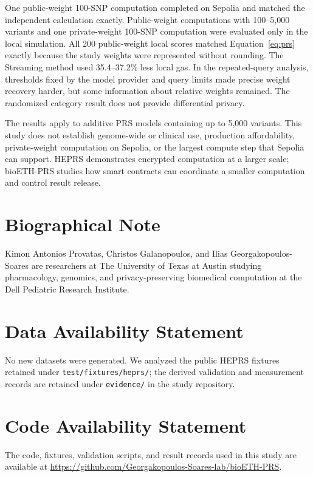 \documentclass[10pt]{article}
\begin{document}
One public-weight 100-SNP computation completed on Sepolia and matched the independent
calculation exactly.  Public-weight computations with 100--5,000 variants and one
private-weight 100-SNP computation were evaluated only in the local simulation.  All
200 public-weight local scores matched
Equation~\ref{eq:prs} exactly because the study weights were represented without
rounding.  The Streaming method used 35.4--37.2\% less local gas.  In the repeated-query
analysis, thresholds fixed by the model provider and query limits made precise weight
recovery harder,
but some information about relative weights remained.  The randomized category result
does not provide differential privacy.

The results apply to additive PRS models containing up to 5,000 variants.  This study
does not establish genome-wide or clinical use, production affordability,
private-weight computation on Sepolia, or the largest compute step that Sepolia can
support.  HEPRS demonstrates encrypted computation at a larger scale; bioETH-PRS studies
how smart contracts can coordinate a smaller computation and control result release.

\section*{Biographical Note}
Kimon Antonios Provatas, Christos Galanopoulos, and Ilias Georgakopoulos-Soares are researchers at The University of Texas at Austin studying pharmacology, genomics, and privacy-preserving biomedical computation at the Dell Pediatric Research Institute.

\section*{Data Availability Statement}
No new datasets were generated.  We analyzed the public HEPRS fixtures retained under
\texttt{test/fixtures/heprs/}; the derived validation and measurement records are retained
under \texttt{evidence/} in the study repository.

\section*{Code Availability Statement}
The code, fixtures, validation scripts, and result records used in this study are available
at \url{https://github.com/Georgakopoulos-Soares-lab/bioETH-PRS}.



\end{document}
